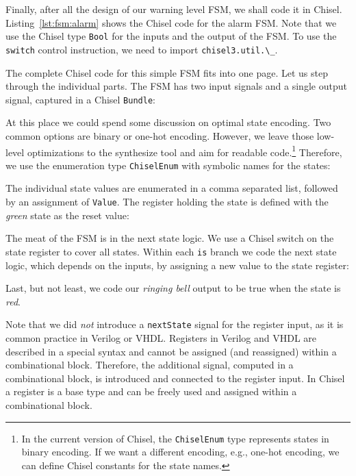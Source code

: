 \documentclass[%
    10pt,
    headinclude, footexclude,
    openright, %
    notitlepage,
    cleardoubleempty,
    headsepline,
    pointlessnumbers,
    bibtotoc, idxtotoc,
    ]{scrbook}
\newcommand{\code}[1]{{\lstinline[basicstyle=\small\ttfamily]{#1}}}
\newcommand{\codefoot}[1]{{\lstinline[basicstyle=\footnotesize\ttfamily]{#1}}}
\begin{document}
Finally, after all the design of our warning level FSM, we shall code it in Chisel.
Listing~\ref{lst:fsm:alarm} shows the Chisel code for the alarm FSM.
Note that we use the Chisel type \code{Bool} for the inputs and the
output of the FSM.
To use the \code{switch} control instruction, we need to
import \code{chisel3.util.\_}.


The complete Chisel code for this simple FSM fits into one page.
Let us step through the individual parts.
The FSM has two input signals and a single output signal, captured in a Chisel \code{Bundle}:
%


\noindent At this place we could spend some discussion on optimal state encoding. Two common options
are binary or one-hot encoding. However, we leave those low-level optimizations to
the synthesize tool and aim for readable code.\footnote{In the current version
of Chisel, the \codefoot{ChiselEnum} type represents states in binary encoding.
If we want a different encoding, e.g., one-hot encoding, we can define Chisel
constants for the state names.}
Therefore, we use the enumeration type \code{ChiselEnum} with symbolic names for the states:


\noindent The individual state values are enumerated in a comma separated list,
followed by an assignment of \code{Value}.
The register holding the state is defined with the \emph{green} state as the reset value:


\noindent The meat of the FSM is in the next state logic. We use a Chisel switch on the
state register to cover all states. Within each \code{is} branch we code the next state
logic, which depends on the inputs, by assigning a new value to the state register:


\noindent Last, but not least, we code our \emph{ringing bell} output to be true when
the state is \emph{red}.


Note that we did \emph{not} introduce a \code{nextState} signal for the register input,
as it is common practice in Verilog or VHDL.
Registers in Verilog and VHDL are described in a special syntax and cannot
be assigned (and reassigned) within a combinational block.
Therefore, the additional signal, computed in a combinational block, is
introduced and connected to the register input.
In Chisel a register is a base type and can be freely used and assigned
within a combinational block.
\end{document}
